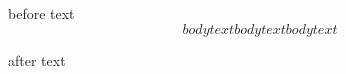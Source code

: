 \begin{surround}
	before text
	\[
    body text
      body text
body text
  \] 

	after text
\end{surround}
